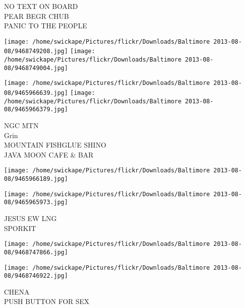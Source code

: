 \documentclass[10pt,letterpaper]{article}
\begin{document}
NO TEXT ON BOARD\\
PEAR BEGR CHUB\\
PANIC TO THE PEOPLE\\
\pagebreak

\texttt{[image: /home/swickape/Pictures/flickr/Downloads/Baltimore 2013-08-08/9468749208.jpg]}
\texttt{[image: /home/swickape/Pictures/flickr/Downloads/Baltimore 2013-08-08/9468749004.jpg]}

\texttt{[image: /home/swickape/Pictures/flickr/Downloads/Baltimore 2013-08-08/9465966639.jpg]}
\texttt{[image: /home/swickape/Pictures/flickr/Downloads/Baltimore 2013-08-08/9465966379.jpg]}

NGC MTN\\
Grin\\
MOUNTAIN FISHGLUE SHINO\\
JAVA MOON CAFE \& BAR\\
\pagebreak

\texttt{[image: /home/swickape/Pictures/flickr/Downloads/Baltimore 2013-08-08/9465966189.jpg]}

\vspace{0.25in}
\texttt{[image: /home/swickape/Pictures/flickr/Downloads/Baltimore 2013-08-08/9465965973.jpg]}

JESUS EW LNG\\
SPORKIT\\
\pagebreak

\texttt{[image: /home/swickape/Pictures/flickr/Downloads/Baltimore 2013-08-08/9468747866.jpg]}

\vspace{0.25in}
\texttt{[image: /home/swickape/Pictures/flickr/Downloads/Baltimore 2013-08-08/9468746922.jpg]}

CHENA\\
PUSH BUTTON FOR SEX\\
\pagebreak
\end{document}
